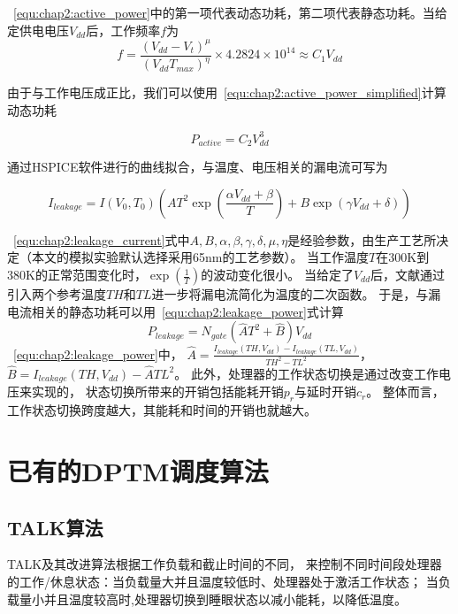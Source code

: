 ~\ref{equ:chap2:active_power}中的第一项代表动态功耗，第二项代表静态功耗。当给定供电电压$V_{dd}$后，工作频率$f$为
\begin{equation}
\label{equ:chap2:freq}
f = \frac{(V_{dd}-V_t)^\mu}{(V_{dd}T_{max})^\eta}\times 4.2824\times 10^{14} \approx C_1V_{dd}
\end{equation}

由于与工作电压成正比，我们可以使用~\ref{equ:chap2:active_power_simplified}计算动态功耗

\begin{equation}
\label{equ:chap2:active_power_simplified}
P_{active} = C_2V_{dd}^3
\end{equation}

通过HSPICE软件进行的曲线拟合，与温度、电压相关的漏电流可写为

\begin{equation}
\label{equ:chap2:leakage_current}
I_{leakage} = I(V_0,T_0)(AT^2\exp(\frac{\alpha V_{dd}+\beta}{T})+B\exp(\gamma V_{dd}+\delta))
\end{equation}

~\ref{equ:chap2:leakage_current}式中$A,B,\alpha,\beta,\gamma,\delta,\mu,\eta$是经验参数，由生产工艺所决定（本文的模拟实验默认选择采用65nm的工艺参数）。 当工作温度$T$在300K到380K的正常范围变化时，$\exp(\frac{1}{T})$的波动变化很小。 当给定了$V_{dd}$后，文献通过引入两个参考温度$TH$和$TL$进一步将漏电流简化为温度的二次函数。 于是，与漏电流相关的静态功耗可以用~\ref{equ:chap2:leakage_power}式计算
\begin{equation}
\label{equ:chap2:leakage_power}
P_{leakage} = N_{gate}(\hat{A}T^2+\hat{B})V_{dd}
\end{equation}
~\ref{equ:chap2:leakage_power}中，
$\hat{A}=\frac{I_{leakage}(TH,V_{dd})-I_{leakage}(TL,V_{dd})}{{TH}^2-{TL}^2}$，
$\hat{B}=I_{leakage}(TH,V_{dd})-\hat{A}{TL}^2$。
此外，处理器的工作状态切换是通过改变工作电压来实现的， 状态切换所带来的开销包括能耗开销$p_r$与延时开销$c_r$。 整体而言，工作状态切换跨度越大，其能耗和时间的开销也就越大。


\section{已有的DPTM调度算法}
\label{algorithms}

\subsection{TALK算法}
TALK及其改进算法根据工作负载和截止时间的不同， 来控制不同时间段处理器的工作/休息状态：当负载量大并且温度较低时、处理器处于激活工作状态； 当负载量小并且温度较高时,处理器切换到睡眼状态以减小能耗，以降低温度。


